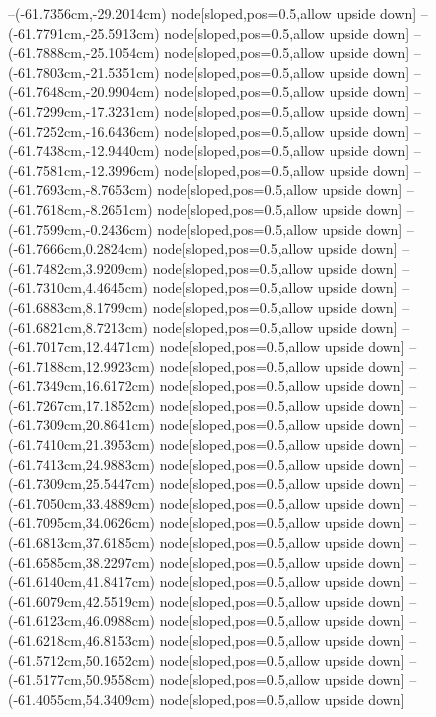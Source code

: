 --(-61.7356cm,-29.2014cm) node[sloped,pos=0.5,allow upside down]{\arrowIn}
--(-61.7791cm,-25.5913cm) node[sloped,pos=0.5,allow upside down]{\ArrowIn}
--(-61.7888cm,-25.1054cm) node[sloped,pos=0.5,allow upside down]{\arrowIn}
--(-61.7803cm,-21.5351cm) node[sloped,pos=0.5,allow upside down]{\ArrowIn}
--(-61.7648cm,-20.9904cm) node[sloped,pos=0.5,allow upside down]{\arrowIn}
--(-61.7299cm,-17.3231cm) node[sloped,pos=0.5,allow upside down]{\ArrowIn}
--(-61.7252cm,-16.6436cm) node[sloped,pos=0.5,allow upside down]{\arrowIn}
--(-61.7438cm,-12.9440cm) node[sloped,pos=0.5,allow upside down]{\ArrowIn}
--(-61.7581cm,-12.3996cm) node[sloped,pos=0.5,allow upside down]{\arrowIn}
--(-61.7693cm,-8.7653cm) node[sloped,pos=0.5,allow upside down]{\ArrowIn}
--(-61.7618cm,-8.2651cm) node[sloped,pos=0.5,allow upside down]{\arrowIn}
--(-61.7599cm,-0.2436cm) node[sloped,pos=0.5,allow upside down]{\ArrowIn}
--(-61.7666cm,0.2824cm) node[sloped,pos=0.5,allow upside down]{\arrowIn}
--(-61.7482cm,3.9209cm) node[sloped,pos=0.5,allow upside down]{\ArrowIn}
--(-61.7310cm,4.4645cm) node[sloped,pos=0.5,allow upside down]{\arrowIn}
--(-61.6883cm,8.1799cm) node[sloped,pos=0.5,allow upside down]{\ArrowIn}
--(-61.6821cm,8.7213cm) node[sloped,pos=0.5,allow upside down]{\arrowIn}
--(-61.7017cm,12.4471cm) node[sloped,pos=0.5,allow upside down]{\ArrowIn}
--(-61.7188cm,12.9923cm) node[sloped,pos=0.5,allow upside down]{\arrowIn}
--(-61.7349cm,16.6172cm) node[sloped,pos=0.5,allow upside down]{\ArrowIn}
--(-61.7267cm,17.1852cm) node[sloped,pos=0.5,allow upside down]{\arrowIn}
--(-61.7309cm,20.8641cm) node[sloped,pos=0.5,allow upside down]{\ArrowIn}
--(-61.7410cm,21.3953cm) node[sloped,pos=0.5,allow upside down]{\arrowIn}
--(-61.7413cm,24.9883cm) node[sloped,pos=0.5,allow upside down]{\ArrowIn}
--(-61.7309cm,25.5447cm) node[sloped,pos=0.5,allow upside down]{\arrowIn}
--(-61.7050cm,33.4889cm) node[sloped,pos=0.5,allow upside down]{\ArrowIn}
--(-61.7095cm,34.0626cm) node[sloped,pos=0.5,allow upside down]{\arrowIn}
--(-61.6813cm,37.6185cm) node[sloped,pos=0.5,allow upside down]{\ArrowIn}
--(-61.6585cm,38.2297cm) node[sloped,pos=0.5,allow upside down]{\arrowIn}
--(-61.6140cm,41.8417cm) node[sloped,pos=0.5,allow upside down]{\ArrowIn}
--(-61.6079cm,42.5519cm) node[sloped,pos=0.5,allow upside down]{\arrowIn}
--(-61.6123cm,46.0988cm) node[sloped,pos=0.5,allow upside down]{\ArrowIn}
--(-61.6218cm,46.8153cm) node[sloped,pos=0.5,allow upside down]{\arrowIn}
--(-61.5712cm,50.1652cm) node[sloped,pos=0.5,allow upside down]{\ArrowIn}
--(-61.5177cm,50.9558cm) node[sloped,pos=0.5,allow upside down]{\arrowIn}
--(-61.4055cm,54.3409cm) node[sloped,pos=0.5,allow upside down]{\ArrowIn}
